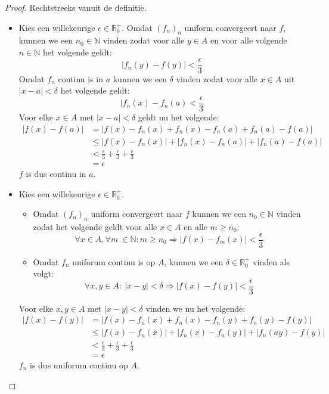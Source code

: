 \documentclass[main.tex]{subfiles}
\begin{document}
\begin{bst}
  \begin{proof}
    Rechtstreeks vanuit de definitie.
    \begin{itemize}
    \item 
      Kies een willekeurige $\epsilon \in \mathbb{R}_{0}^{+}$.
      Omdat $(f_{n})_{n}$ uniform convergeert naar $f$, kunnen we een $n_{0}\in \mathbb{N}$ vinden zodat voor alle $y\in A$ en voor alle volgende $n\in \mathbb{N}$ het volgende geldt:
      \[ |f_{n}(y)-f(y)|<\frac{\epsilon}{3} \]
      Omdat $f_{n}$ continu is in $a$ kunnen we een $\delta$ vinden
      zodat voor alle $x\in A$ uit $|x-a|<\delta$ het volgende geldt:
      \[ |f_{n}(x) - f_{n}(a) < \frac{\epsilon}{3} \]
      Voor elke $x\in A$ met $|x-a|<\delta$ geldt nu het volgende:
      \[
      \begin{array}{rl}
        |f(x)-f(a)| &= |f(x) - f_{n}(x) + f_{n}(x) - f_{n}(a) + f_{n}(a) - f(a)|\\
                    &\le |f(x) - f_{n}(x)| + |f_{n}(x) - f_{n}(a)| + |f_{n}(a) - f(a)|\\
                    &< \frac{\epsilon}{3} + \frac{\epsilon}{3} + \frac{\epsilon}{3}\\
                    &= \epsilon
      \end{array}
      \]
      $f$ is dus continu in $a$.
    \item
      Kies een willekeurige $\epsilon \in \mathbb{R}_{0}^{+}$.
      \begin{itemize}
      \item Omdat $(f_{n})_{n}$ uniform convergeert naar $f$ kunnen we een $n_{0} \in \mathbb{N}$ vinden zodat het volgende geldt voor alle $x \in A$ en alle $m \ge n_{0}$:
        \[ \forall x\in A, \forall m\ \in \mathbb{N}: m \ge n_{0} \Rightarrow |f(x)-f_{m}(x)| < \frac{\epsilon}{3} \]
      \item 
        Omdat $f_{n}$ uniforum continu is op $A$, kunnen we een $\delta \in \mathbb{R}_{0}^{+}$ vinden als volgt:
        \[ \forall x,y \in A:\  |x-y| < \delta \Rightarrow |f(x)-f(y)| < \frac{\epsilon}{3} \]
      \end{itemize}
      Voor elke $x,y \in A$ met $|x-y| < \delta$ vinden we nu het volgende:
      \[
      \begin{array}{rl}
        |f(x)-f(y)| &= |f(x)-f_{n}(x) + f_{n}(x) - f_{n}(y) + f_{n}(y) - f(y)|\\
                    &\le |f(x)-f_{n}(x)| + |f_{n}(x) - f_{n}(y)| + |f_{n}(ay) - f(y)|\\
                    &< \frac{\epsilon}{3} + \frac{\epsilon}{3} + \frac{\epsilon}{3}\\
                    &= \epsilon
      \end{array}
      \]
      $f_{n}$ is dus uniforum continu op $A$.
    \end{itemize}
  \end{proof}
\end{bst}
\end{document}
